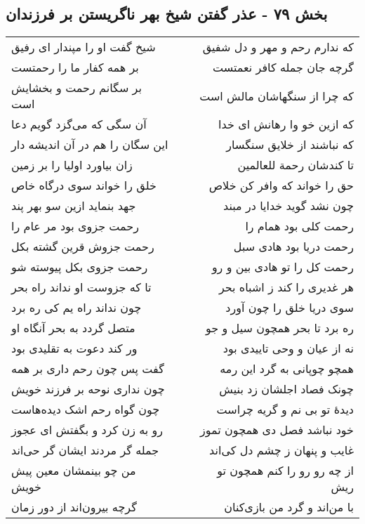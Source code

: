 \begin{center}
\section*{بخش ۷۹ - عذر گفتن شیخ بهر ناگریستن بر فرزندان}
\label{sec:sh079}
\begin{longtable}{l p{0.5cm} r}
شیخ گفت او را مپندار ای رفیق
&&
که ندارم رحم و مهر و دل شفیق
\\
بر همه کفار ما را رحمتست
&&
گرچه جان جمله کافر نعمتست
\\
بر سگانم رحمت و بخشایش است
&&
که چرا از سنگهاشان مالش است
\\
آن سگی که می‌گزد گویم دعا
&&
که ازین خو وا رهانش ای خدا
\\
این سگان را هم در آن اندیشه دار
&&
که نباشند از خلایق سنگسار
\\
زان بیاورد اولیا را بر زمین
&&
تا کندشان رحمة للعالمین
\\
خلق را خواند سوی درگاه خاص
&&
حق را خواند که وافر کن خلاص
\\
جهد بنماید ازین سو بهر پند
&&
چون نشد گوید خدایا در مبند
\\
رحمت جزوی بود مر عام را
&&
رحمت کلی بود همام را
\\
رحمت جزوش قرین گشته بکل
&&
رحمت دریا بود هادی سبل
\\
رحمت جزوی بکل پیوسته شو
&&
رحمت کل را تو هادی بین و رو
\\
تا که جزوست او نداند راه بحر
&&
هر غدیری را کند ز اشباه بحر
\\
چون نداند راه یم کی ره برد
&&
سوی دریا خلق را چون آورد
\\
متصل گردد به بحر آنگاه او
&&
ره برد تا بحر همچون سیل و جو
\\
ور کند دعوت به تقلیدی بود
&&
نه از عیان و وحی تاییدی بود
\\
گفت پس چون رحم داری بر همه
&&
همچو چوپانی به گرد این رمه
\\
چون نداری نوحه بر فرزند خویش
&&
چونک فصاد اجلشان زد بنیش
\\
چون گواه رحم اشک دیده‌هاست
&&
دیدهٔ تو بی نم و گریه چراست
\\
رو به زن کرد و بگفتش ای عجوز
&&
خود نباشد فصل دی همچون تموز
\\
جمله گر مردند ایشان گر حی‌اند
&&
غایب و پنهان ز چشم دل کی‌اند
\\
من چو بینمشان معین پیش خویش
&&
از چه رو رو را کنم همچون تو ریش
\\
گرچه بیرون‌اند از دور زمان
&&
با من‌اند و گرد من بازی‌کنان
\\

\end{longtable}
\end{center}

